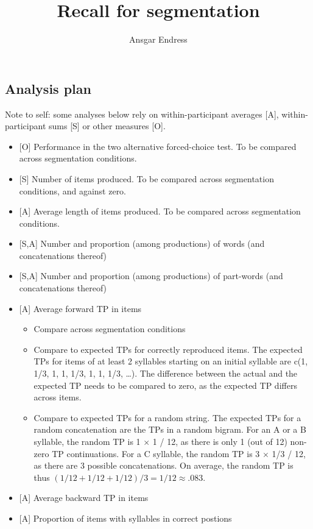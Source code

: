 \documentclass[]{article}
\title{Recall for segmentation}
\author{Ansgar Endress}
\date{}
\providecommand{\tightlist}{%
  \setlength{\itemsep}{0pt}\setlength{\parskip}{0pt}}
\begin{document}
\subsection{Analysis plan}\label{analysis-plan}

Note to self: some analyses below rely on within-participant averages
{[}A{]}, within-participant sums {[}S{]} or other measures {[}O{]}.

\begin{itemize}
\tightlist
\item
  {[}O{]} Performance in the two alternative forced-choice test. To be
  compared across segmentation conditions.
\item
  {[}S{]} Number of items produced. To be compared across segmentation
  conditions, and against zero.
\item
  {[}A{]} Average length of items produced. To be compared across
  segmentation conditions.
\item
  {[}S,A{]} Number and proportion (among productions) of words (and
  concatenations thereof)
\item
  {[}S,A{]} Number and proportion (among productions) of part-words (and
  concatenations thereof)
\item
  {[}A{]} Average forward TP in items

  \begin{itemize}
  \tightlist
  \item
    Compare across segmentation conditions
  \item
    Compare to expected TPs for correctly reproduced items. The expected
    TPs for items of at least 2 syllables starting on an initial
    syllable are c(1, 1/3, 1, 1, 1/3, 1, 1, 1/3, \ldots{}). The
    difference between the actual and the expected TP needs to be
    compared to zero, as the expected TP differs across items.
  \item
    Compare to expected TPs for a random string. The expected TPs for a
    random concatenation are the TPs in a random bigram. For an A or a B
    syllable, the random TP is 1 \(\times\) 1 / 12, as there is only 1
    (out of 12) non-zero TP continuations. For a C syllable, the random
    TP is 3 \(\times\) 1/3 / 12, as there are 3 possible concatenations.
    On average, the random TP is thus
    \((1/12 + 1/12 + 1/12)/ 3 = 1/12 \approx .083\).
  \end{itemize}
\item
  {[}A{]} Average backward TP in items
\item
  {[}A{]} Proportion of items with syllables in correct postions


\end{itemize}
\end{document}
